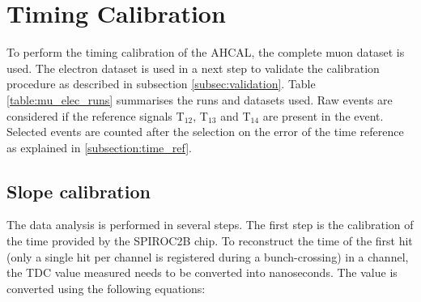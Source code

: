 \section{Timing Calibration}

To perform the timing calibration of the AHCAL, the complete muon dataset is used. The electron dataset is used in a next step to validate the calibration procedure as described in subsection \ref{subsec:validation}. Table \ref{table:mu_elec_runs} summarises the runs and datasets used. Raw events are considered if the reference signals T$_{12}$,  T$_{13}$ and T$_{14}$ are present in the event. Selected events are counted after the selection on the error of the time reference as explained in \ref{subsection:time_ref}.

\begin{table}[t]
	\centering
	\caption{Table with the statistic before and after selection used for timing calibration.}
	\label{table:mu_elec_runs}
\end{table}

\subsection{Slope calibration}
\label{subsec:slope_calib}

The data analysis is performed in several steps. The first step is the calibration of the time provided by the SPIROC2B chip. To reconstruct the time of the first hit (only a single hit per channel is registered during a bunch-crossing) in a channel, the TDC value measured needs to be converted into nanoseconds. The value is converted using the following equations:

